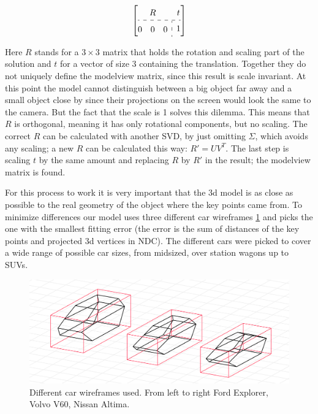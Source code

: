 \documentclass[conference]{IEEEtran}
\begin{document}
\begin{equation}
    \renewcommand{\arraystretch}{1.5}
    \left[\begin{array}{@{}c:c@{}}
            R                        & t \\ \hdashline
            \begin{array}{@{}ccc@{}}
                0 & 0 & 0
            \end{array} & 1
        \end{array}\right]
\end{equation}

Here $R$ stands for a $3\times3$ matrix that holds the rotation and scaling part of the solution and $t$ for a vector of size 3 containing the translation. Together they do not uniquely define the modelview matrix, since this result is scale invariant. At this point the model cannot distinguish between a big object far away and a small object close by since their projections on the screen would look the same to the camera. But the fact that the scale is 1 solves this dilemma. This means that $R$ is orthogonal, meaning it has only rotational components, but no scaling. The correct $R$ can be calculated with another SVD, by just omitting $\Sigma$, which avoids any scaling; a new $R$ can be calculated this way: $R' = UV^{T}$. The last step is scaling $t$ by the same amount and replacing $R$ by $R'$ in the result; the modelview matrix is found.

For this process to work it is very important that the 3d model is as close as possible to the real geometry of the object where the key points came from. To minimize differences our model uses three different car wireframes \ref{img:wireframes} and picks the one with the smallest fitting error (the error is the sum of distances of the key points and projected 3d vertices in NDC). The different cars were picked to cover a wide range of possible car sizes, from midsized, over station wagons up to SUVs.

\begin{figure}[H]
    \centering
    \includegraphics[width=0.7\columnwidth]{./images/wireframes.png}
    \caption{Different car wireframes used. From left to right Ford Explorer, Volvo V60, Nissan Altima.}
    \label{img:wireframes}
\end{figure}
\end{document}

